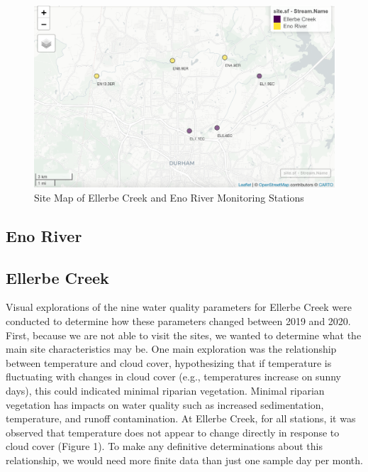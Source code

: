 \documentclass[
  12pt,
]{article}
\begin{document}
\begin{figure}

{\centering \includegraphics[width=1\linewidth]{Output/SiteMap} 

}

\caption{Site Map of Ellerbe Creek and Eno River Monitoring Stations}\label{fig:unnamed-chunk-1}
\end{figure}

\hypertarget{eno-river}{%
\subsection{Eno River}\label{eno-river}}

\hypertarget{ellerbe-creek}{%
\subsection{Ellerbe Creek}\label{ellerbe-creek}}

Visual explorations of the nine water quality parameters for Ellerbe
Creek were conducted to determine how these parameters changed between
2019 and 2020. First, because we are not able to visit the sites, we
wanted to determine what the main site characteristics may be. One main
exploration was the relationship between temperature and cloud cover,
hypothesizing that if temperature is fluctuating with changes in cloud
cover (e.g., temperatures increase on sunny days), this could indicated
minimal riparian vegetation. Minimal riparian vegetation has impacts on
water quality such as increased sedimentation, temperature, and runoff
contamination. At Ellerbe Creek, for all stations, it was observed that
temperature does not appear to change directly in response to cloud
cover (Figure 1). To make any definitive determinations about this
relationship, we would need more finite data than just one sample day
per month.
\end{document}
